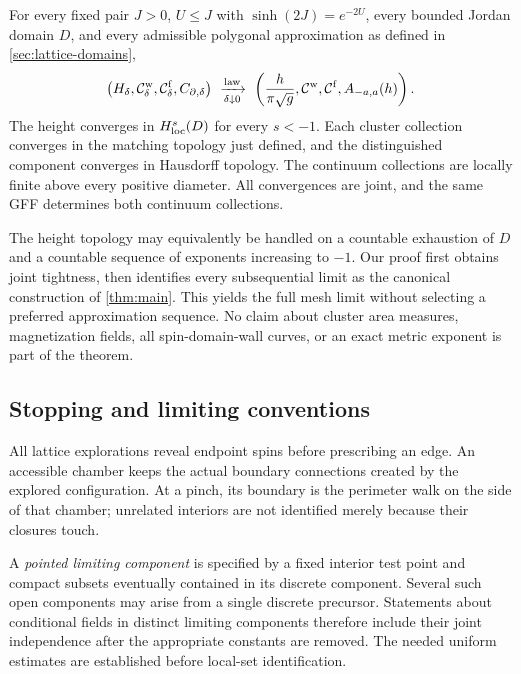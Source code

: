 \begin{theorem}\label{thm:main}
For every fixed pair $J>0$, $U\le J$ with $\sinh(2J)=e^{-2U}$,
every bounded Jordan domain $D$, and every admissible polygonal
approximation as defined in \cref{sec:lattice-domains},
\[
 \bigl(H_\delta,\mathcal C_\delta^{\rm w},\mathcal C_\delta^{\rm f},
                         C_{\partial,\delta}\bigr)
 \ \xrightarrow[\delta\downarrow0]{\mathrm{law}}\
 \left(\frac{h}{\pi\sqrt g},\mathcal C^{\rm w},\mathcal C^{\rm f},
                         A_{-a,a}(h)\right).
\]
The height converges in \(H^s_{\rm loc}(D)\) for every \(s<-1\).
Each cluster collection converges in the matching topology just
defined, and the distinguished component converges in Hausdorff
topology. The continuum collections are locally finite above every
positive diameter. All convergences are joint, and the same GFF
determines both continuum collections.
\end{theorem}

The height topology may equivalently be handled on a countable
exhaustion of \(D\) and a countable sequence of exponents increasing
to \(-1\). Our proof first obtains joint tightness, then identifies
every subsequential limit as the canonical construction of
\cref{thm:main}. This yields the full mesh limit without selecting a
preferred approximation sequence. No claim about cluster area measures,
magnetization fields, all spin-domain-wall curves, or an exact metric
exponent is part of the theorem.

\subsection{Stopping and limiting conventions}\label{subsec:conventions}
All lattice explorations reveal endpoint spins before prescribing an
edge. An accessible chamber keeps the actual boundary connections
created by the explored configuration. At a pinch, its boundary is the
perimeter walk on the side of that chamber; unrelated interiors are
not identified merely because their closures touch.

A \emph{pointed limiting component} is specified by a fixed interior
test point and compact subsets eventually contained in its discrete
component. Several such open components may arise from a single
discrete precursor. Statements about conditional fields in distinct
limiting components therefore include their joint independence after
the appropriate constants are removed. The needed uniform estimates
are established before local-set identification.

